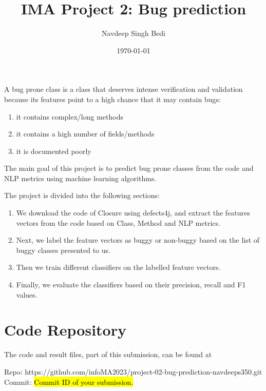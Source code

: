 \documentclass{article}
\title{IMA Project 2: Bug prediction}
\author{Navdeep Singh Bedi}
\date{\today}
\newcommand\templateInstruction[1]{
\hl{#1}
}
\begin{document}
\setcounter{section}{-1}

\maketitle

A bug prone class is a class that deserves intense verification and validation
because its features point to a high chance that it may contain bugs:
\begin{enumerate}
    \item it contains complex/long methods
    \item it contains a high number of fields/methods
    \item it is documented poorly
\end{enumerate}
The main goal of this project is to predict bug prone classes from the code and NLP metrics
using machine learning algorithms.

The project is divided into the following sections:
\begin{enumerate}
    \item We download the code of Closure using defects4j, 
    and extract the features vectors from the code based on Class, Method and NLP metrics.
    \item Next, we label the feature vectors as buggy or non-buggy based on the list of buggy classes presented to us.
    \item Then we train different classifiers on the labelled feature vectors.
    \item Finally, we evaluate the classifiers based on their precision, recall and F1 values.
\end{enumerate}
\section{Code Repository}

The code and result files, part of this submission, can be found at

\begin{center}
    Repo: https://github.com/infoMA2023/project-02-bug-prediction-navdeeps350.git \\
    Commit: \templateInstruction{Commit ID of your submission.}
\end{center}
\end{document}
